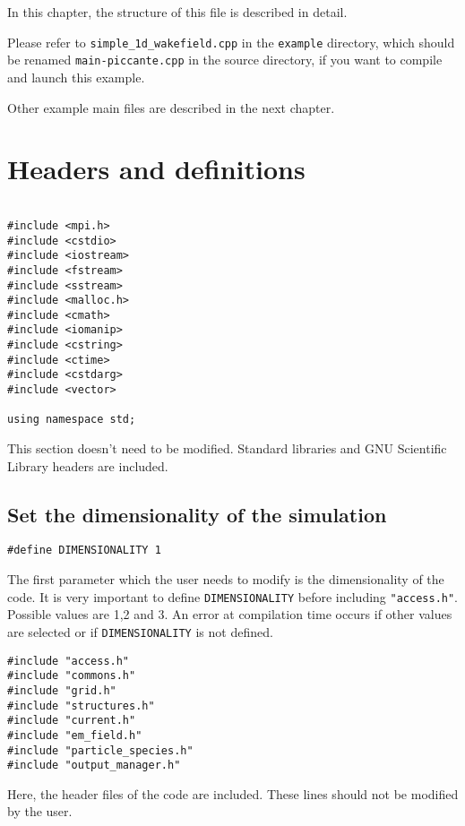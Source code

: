 \documentclass[11pt,a4paper]{report}
\begin{document}
In this chapter, the structure of this file is described in detail.

Please refer to \verb+simple_1d_wakefield.cpp+ in the \verb+example+ directory, which should be renamed \verb+main-piccante.cpp+ in the source directory, if you want to compile and launch this example.

Other example main files are described in the next chapter.

\section{Headers and definitions}
\begin{lstlisting}[backgroundcolor=\color{no_modify}]

#include <mpi.h>
#include <cstdio>
#include <iostream>
#include <fstream>
#include <sstream>
#include <malloc.h>
#include <cmath>
#include <iomanip>
#include <cstring>
#include <ctime>
#include <cstdarg>
#include <vector>

using namespace std;
\end{lstlisting}
This section doesn't need to be modified. Standard libraries and GNU Scientific Library headers are included.


\subsection*{Set the dimensionality of the simulation}
\begin{lstlisting}
#define DIMENSIONALITY 1
\end{lstlisting}
The first parameter which the user needs to modify is the dimensionality of the code. It is very important to define \verb+DIMENSIONALITY+ before including \verb+"access.h"+. Possible values are 1,2 and 3. An error at compilation time occurs if other values are selected or if \verb+DIMENSIONALITY+ is not defined.
\begin{lstlisting}[backgroundcolor=\color{no_modify}]
#include "access.h"
#include "commons.h"
#include "grid.h"
#include "structures.h"
#include "current.h"
#include "em_field.h"
#include "particle_species.h"
#include "output_manager.h"
\end{lstlisting}
Here, the header files of the code are included. These lines should not be modified by the user.

\end{document}
